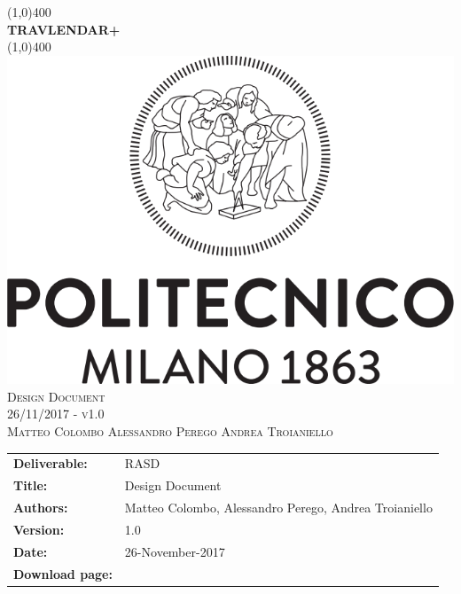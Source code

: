 



\begin{titlepage}
	\begin{center}
		\line(1,0){400}\\	[0.6cm]
		\Huge{\bfseries{TRAVLENDAR+}}\\
		\line(1,0){400}\\
		[3cm]
		\includegraphics[scale=0.3]{Images/polimi}\\
		[3cm]
		\textsc{\Huge Design Document}\\[1cm]
		\textsc{\huge 26/11/2017 - v1.0}\\
		[4cm]
		\textsc{\normalsize Matteo Colombo \hspace{0.4cm} Alessandro Perego \hspace{0.4cm} Andrea Troianiello }
	\end{center}
\end{titlepage}
	
\begin{table}[h!]
\begin{tabu} to \textwidth { X[0.3,r,p] X[0.7,l,p] }
\hline

\textbf{Deliverable:} & RASD\\
\textbf{Title:} & Design Document \\
\textbf{Authors:} & Matteo Colombo, Alessandro Perego, Andrea Troianiello \\
\textbf{Version:} & 1.0 \\ 
\textbf{Date:} & 26-November-2017 \\
\textbf{Download page:} & \href{https://github.com/MatteoColombo/ColomboPeregoTroianiello}{\color{Black}{GitHub - ColomboPeregoTroianiello repository}} \\
\hline
\end{tabu}
\end{table}

